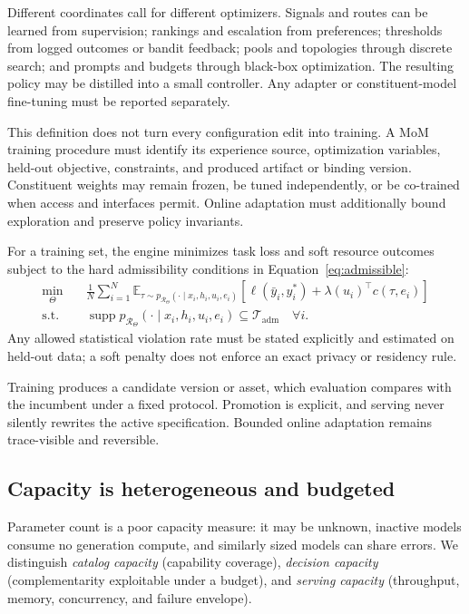 Different coordinates call for different optimizers. Signals and routes can be
learned from supervision; rankings and escalation from preferences; thresholds
from logged outcomes or bandit feedback; pools and topologies through discrete
search; and prompts and budgets through black-box optimization. The resulting
policy may be distilled into a small controller. Any adapter or
constituent-model fine-tuning must be reported separately.

This definition does not turn every configuration edit into training. A MoM
training procedure must identify its experience source, optimization variables,
held-out objective, constraints, and produced artifact or binding version.
Constituent weights may remain frozen, be tuned independently, or be co-trained
when access and interfaces permit. Online adaptation must additionally bound
exploration and preserve policy invariants.

For a training set, the engine minimizes task loss and soft resource outcomes
subject to the hard admissibility conditions in Equation~\ref{eq:admissible}:
\begin{equation}
\begin{aligned}
 \min_{\Theta}\quad &\frac{1}{N}\sum_{i=1}^{N}
 \mathbb{E}_{\tau\sim p_{\mathcal{R}_{\Theta}}
 (\cdot\mid x_i,h_i,u_i,e_i)}
 \left[\ell(\bar y_i,y_i^*)+\lambda(u_i)^{\top}c(\tau,e_i)\right]\\
 \text{s.t.}\quad &
 \operatorname{supp}p_{\mathcal{R}_{\Theta}}
 (\cdot\mid x_i,h_i,u_i,e_i)\subseteq\mathcal{T}_{\mathrm{adm}}
 \quad\forall i.
\end{aligned}
 \label{eq:mom-training}
\end{equation}
Any allowed statistical violation rate must be stated explicitly and estimated
on held-out data; a soft penalty does not enforce an exact privacy or residency
rule.

Training produces a candidate version or asset, which evaluation compares with
the incumbent under a fixed protocol. Promotion is explicit, and serving never
silently rewrites the active specification. Bounded online adaptation remains
trace-visible and reversible.

\subsection{Capacity is heterogeneous and budgeted}
\label{sec:capacity}

Parameter count is a poor capacity measure: it may be unknown, inactive models
consume no generation compute, and similarly sized models can share errors.
We distinguish \emph{catalog capacity} (capability coverage), \emph{decision
capacity} (complementarity exploitable under a budget), and \emph{serving
capacity} (throughput, memory, concurrency, and failure envelope).

